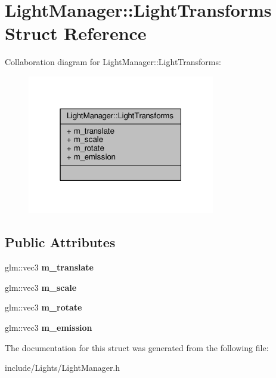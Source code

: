 \hypertarget{struct_light_manager_1_1_light_transforms}{\section{Light\-Manager\-:\-:Light\-Transforms Struct Reference}
\label{struct_light_manager_1_1_light_transforms}
}


Collaboration diagram for Light\-Manager\-:\-:Light\-Transforms\-:
\nopagebreak
\begin{figure}[H]
\begin{center}
\leavevmode
\includegraphics[width=232pt]{struct_light_manager_1_1_light_transforms__coll__graph}
\end{center}
\end{figure}
\subsection*{Public Attributes}
\begin{DoxyCompactItemize}
\item 
\hypertarget{struct_light_manager_1_1_light_transforms_aca910f0ba57d010927e00cd12636f63e}{glm\-::vec3 {\bfseries m\-\_\-translate}}\label{struct_light_manager_1_1_light_transforms_aca910f0ba57d010927e00cd12636f63e}

\item 
\hypertarget{struct_light_manager_1_1_light_transforms_a6a2cff465ce93d26f23913063f80b58c}{glm\-::vec3 {\bfseries m\-\_\-scale}}\label{struct_light_manager_1_1_light_transforms_a6a2cff465ce93d26f23913063f80b58c}

\item 
\hypertarget{struct_light_manager_1_1_light_transforms_a98c9bda7160c67256f26bcaff2b1a687}{glm\-::vec3 {\bfseries m\-\_\-rotate}}\label{struct_light_manager_1_1_light_transforms_a98c9bda7160c67256f26bcaff2b1a687}

\item 
\hypertarget{struct_light_manager_1_1_light_transforms_a221430a6b38142458c1ce66399d480bf}{glm\-::vec3 {\bfseries m\-\_\-emission}}\label{struct_light_manager_1_1_light_transforms_a221430a6b38142458c1ce66399d480bf}

\end{DoxyCompactItemize}


The documentation for this struct was generated from the following file\-:\begin{DoxyCompactItemize}
\item 
include/\-Lights/Light\-Manager.\-h\end{DoxyCompactItemize}
